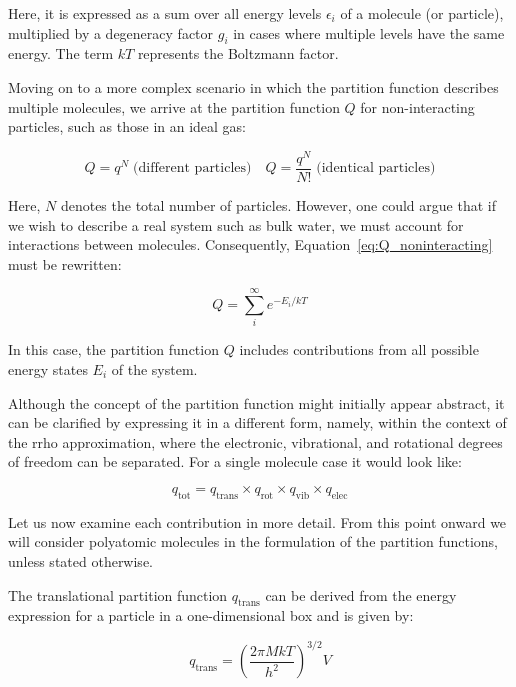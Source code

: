 Here, it is expressed as a sum over all energy levels $\epsilon_i$ of a molecule (or particle), multiplied by a degeneracy factor $g_i$ in cases where multiple levels have the same energy. The term $kT$ represents the Boltzmann factor.

Moving on to a more complex scenario in which the partition function describes multiple molecules, we arrive at the partition function $Q$ for non-interacting particles, such as those in an ideal gas:

\begin{equation}
    \label{eq:Q_noninteracting}
    Q = q^N \; \text{(different particles)} \quad Q = \frac{q^N}{N!} \; \text{(identical particles)}
\end{equation}

Here, $N$ denotes the total number of particles. However, one could argue that if we wish to describe a real system such as bulk water, we must account for interactions between molecules. Consequently, Equation~\ref{eq:Q_noninteracting} must be rewritten:

\begin{equation}
    Q = \sum_{i}^{\infty} e^{-E_i/kT}
\end{equation}

In this case, the partition function $Q$ includes contributions from all possible energy states $E_i$ of the system.

Although the concept of the partition function might initially appear abstract, it can be clarified by expressing it in a different form, namely, within the context of the \ac{rrho} approximation, where the electronic, vibrational, and rotational degrees of freedom can be separated. For a single molecule case it would look like:

\begin{equation}
    q_{\text{tot}} = q_{\text{trans}} \times q_{\text{rot}} \times q_{\text{vib}} \times q_{\text{elec}}
\end{equation}

Let us now examine each contribution in more detail. From this point onward we will consider polyatomic molecules in the formulation of the partition functions, unless stated otherwise.

The translational partition function $q_\text{trans}$ can be derived from the energy expression for a particle in a one-dimensional box and is given by:

\begin{equation}
    q_{\text{trans}} = \left(\frac{2\pi MkT}{h^2}\right)^{3/2} V
\end{equation}

